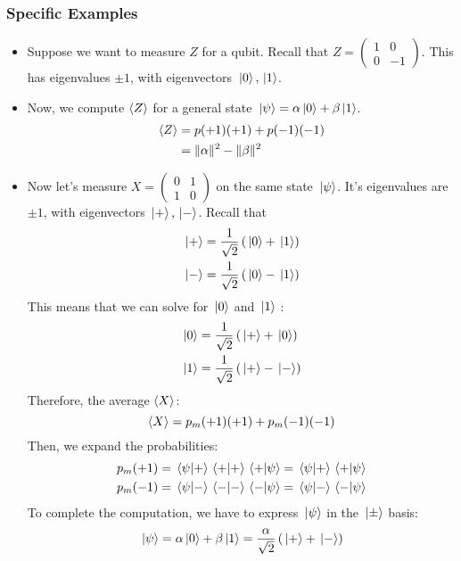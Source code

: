  \subsubsection{Specific Examples}
 \begin{itemize}
	 \item Suppose we want to measure \( Z \) for a qubit. Recall that \( Z = \begin{pmatrix} 1 & 0 \\ 
		 0 & -1 \end{pmatrix}  \). This has eigenvalues \( \pm 1 \), with eigenvectors \( \ket*{0}, \ket*{1} \). 
	 \item Now, we compute \( \langle Z \rangle \) for a general state \( \ket*{\psi} = \alpha\ket*{0} + \beta\ket*{1} \).
		 \begin{align*}
			 \langle Z \rangle &= p(+1)(+1) + p(-1) (-1)\\
			 &=  \|\alpha\|^2 - \|\beta\|^2	
		 \end{align*}
		 \item Now let's measure \( X = \begin{pmatrix} 0 & 1 \\ 1 & 0 \end{pmatrix} \) on the same state 
			 \( \ket*{\psi} \). It's eigenvalues are \( \pm 1 \), with eigenvectors \( \ket*{+},  \ket*{-} \). Recall 
			 that 
			 \begin{align*}
			 	\ket*{+} &= \frac{1}{\sqrt{2} }\left( \ket*{0} + \ket*{1} \right)  \\
				\ket*{-}&= \frac{1}{\sqrt{2} }\left( \ket*{0} - \ket*{1} \right)  
			 \end{align*}
			 This means that we can solve for  \( \ket*{0} \) and \( \ket*{1} \) :
			 \begin{align*}
			 	\ket*{0}&= \frac{1}{\sqrt{2} }\left( \ket*{+} + \ket*{0} \right)  \\
				\ket*{1}&= \frac{1}{\sqrt{2} }\left( \ket*{+} - \ket*{-} \right)  \\
			 \end{align*}
			 Therefore, the average \( \langle X \rangle \):
			 \[
				 \langle X \rangle = p_m(+1)(+1) + p_m(-1)(-1) 
			 \]
			 Then, we expand the probabilities: 
			\begin{align*}
				p_m(+1) &= \braket*{\psi}{+}\braket*{+}{+}\braket*{+}{\psi} = \braket*{\psi}{+}\braket*{+}{\psi} \\
				p_m(-1) &= \braket*{\psi}{-}\braket*{-}{-}\braket*{-}{\psi} = \braket*{\psi}{-}\braket*{-}{\psi}
			\end{align*}
			To complete the computation, we have to express \( \ket*{\psi} \) in the \( \ket*{\pm} \) basis:
			\[
			\ket*{\psi} = \alpha \ket*{0} + \beta \ket*{1} = \frac{\alpha}{\sqrt{2} }\left( \ket*{+} + \ket*{-} \right) 
			\] 
 \end{itemize}

